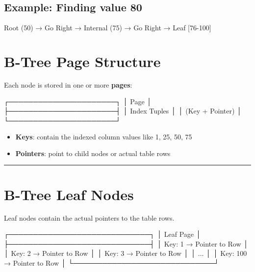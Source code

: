 \documentclass[
]{report}
\newenvironment{Shaded}{\begin{snugshade}}{\end{snugshade}}
\newcommand{\NormalTok}[1]{\textcolor[rgb]{0.00,0.23,0.31}{#1}}
\providecommand{\tightlist}{%
  \setlength{\itemsep}{0pt}\setlength{\parskip}{0pt}}\usepackage{longtable,booktabs,array}
\begin{document}
\subsection{Example: Finding value 80}\label{example-finding-value-80}

\begin{Shaded}
\begin{Highlighting}[]
\NormalTok{Root (50) → Go Right → Internal (75) → Go Right → Leaf [76{-}100]}
\end{Highlighting}
\end{Shaded}

\section{B-Tree Page Structure}\label{b-tree-page-structure}

Each node is stored in one or more \textbf{pages}:

\begin{Shaded}
\begin{Highlighting}[]
\NormalTok{┌──────────────────────┐}
\NormalTok{│   Page               │}
\NormalTok{├──────────────────────┤}
\NormalTok{│   Index Tuples       │}
\NormalTok{│   (Key + Pointer)    │}
\NormalTok{└──────────────────────┘}
\end{Highlighting}
\end{Shaded}

\begin{itemize}
\tightlist
\item
  \textbf{Keys}: contain the indexed column values like 1, 25, 50, 75
\item
  \textbf{Pointers}: point to child nodes or actual table rows
\end{itemize}

\begin{center}\rule{0.5\linewidth}{0.5pt}\end{center}

\section{B-Tree Leaf Nodes}\label{b-tree-leaf-nodes}

Leaf nodes contain the actual pointers to the table rows.

\begin{Shaded}
\begin{Highlighting}[]
\NormalTok{┌─────────────────────────────┐}
\NormalTok{│   Leaf Page                 │}
\NormalTok{├─────────────────────────────┤}
\NormalTok{│   Key: 1   → Pointer to Row │}
\NormalTok{│   Key: 2   → Pointer to Row │}
\NormalTok{│   Key: 3   → Pointer to Row │}
\NormalTok{│   ...                       │}
\NormalTok{│   Key: 100 → Pointer to Row │}
\NormalTok{└─────────────────────────────┘}
\end{Highlighting}
\end{Shaded}
\end{document}
